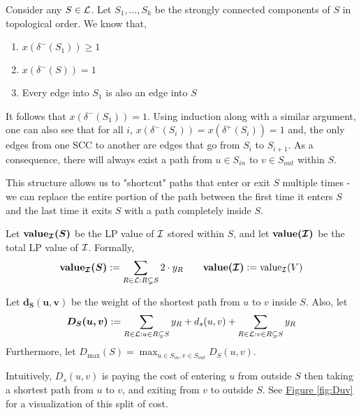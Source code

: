 
	Consider any $S\in \mathcal{L}$. Let $S_1,\dots, S_k$ be the strongly connected components of $S$ in topological order. 
	We know that,
	\begin{enumerate}
		\item $x(\delta^-(S_1)) \geq 1$
		\item $x(\delta^-(S)) = 1$
		\item Every edge into $S_1$ is also an edge into $S$
	\end{enumerate}
	It follows that $x(\delta^-(S_1)) = 1$. 
	Using induction along with a similar argument, one can also see that for all $i$, $x(\delta^-(S_i)) = x(\delta^+(S_i)) = 1$ and, the only edges from one SCC to another are edges that go from $S_i$ to $S_{i + 1}$. 
	As a consequence, there will always exist a path from $u\in S_{in}$ to $v\in S_{out}$ within $S$.
	
	This structure allows us to "shortcut" paths that enter or exit $S$ multiple times - we can replace the entire portion of the path between the first time it enters $S$ and the last time it exits $S$ with a path completely inside $S$.
	
	
	\begin{definition}\label{def:value}
		Let $\bm{\textbf{\textup{value}}_{\mathcal{I}}(S)}$ be the LP value of $\mathcal{I}$ stored within $S$, and let $\bm{\textbf{\textup{value}}(\mathcal{I})}$ be the total LP value of $\mathcal{I}$. Formally, 
		\[
			\bm{\textbf{\textup{value}}_{\mathcal{I}}(S)}:=\sum\limits_{R\in \mathcal{L}:R\subsetneq S}2\cdot y_R\qquad \bm{\textbf{\textup{value}}(\mathcal{I})}:=\textup{value}_{\mathcal{I}}(V)
		\]
	\end{definition}
	
	\begin{definition} 
		Let $\bm{d_S(u,v)}$ be the weight of the shortest path from $u$ to $v$ inside $S$. Also, let 
		\begin{equation}
			\bm{D_S(u,v)}:=\sum_{R\in \mathcal{L} : u\in R\subsetneq S}y_R + d_s(u,v) + \sum_{R\in \mathcal{L} : v\in R\subsetneq S}y_R\label{def:1}
		\end{equation}
		Furthermore, let $D_{\max}(S) = \max_{u \in S_{in}, v \in S_{out}}D_S(u,v)$.
		
		Intuitively, $D_s(u,v)$ is paying the cost of entering $u$ from outside $S$ then taking a shortest path from $u$ to $v$, and exiting from $v$ to outside $S$. See \hyperref[fig:Duv]{Figure \ref{fig:Duv}} for a visualization of this split of cost.
	\end{definition}
	
	
